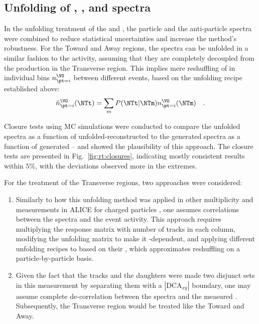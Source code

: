 \subsection{Unfolding of \KOs, \LA, and \AL \pt spectra}

In the unfolding treatment of the \LA and \AL, the particle and the anti-particle \pt spectra were combined to reduce statistical uncertainties and increase the method's robustness. For the Toward and Away regions, the spectra can be unfolded in a similar fashion to the \NT activity, assuming that they are completely decoupled from the production in the Transverse region. This implies mere reshuffling of \VOs in individual \pt bins $n^{\VO}_{\pt=i}$ between different events, based on the unfolding recipe established above:
\begin{align}
\hat{n}^{\VO}_{\pt=i}(\NTt) = \sum_m P(\NTt | \NTm) n^{\VO}_{\pt=i}(\NTm) \quad .
\end{align} 

Closure tests using MC simulations were conducted to compare the unfolded \pt spectra as a function of unfolded-reconstructed \NT to the generated \pt spectra as a function of generated \NT -- and showed the plausibility of this approach. The closure tests are presented in Fig.~\ref{fig:rt:closures}, indicating mostly consistent results within $5\%$, with the deviations observed more in the \RT extremes.

For the treatment of the Transverse regions, two approaches were considered:
\begin{enumerate}
\item Similarly to how this unfolding method was applied in other multiplicity and \NT measurements in ALICE for charged particles \cite{vazquezruedaStudyProductionPp2022}, one assumes correlations between the \pt spectra and the event activity. This approach requires multiplying the response matrix with number of tracks in each column, modifying the unfolding matrix to make it \pt-dependent, and applying different unfolding recipes to \VOs based on their \pt, which approximates reshuffling on a particle-by-particle basis.
\item Given the fact that the \NT tracks and the \VO daughters were made two disjunct sets in this measurement by separating them with a $|\mathrm{DCA}_{xy}|$ boundary, one may assume complete de-correlation between the \VO \pt spectra and the measured \NT. Subsequently, the Transverse region would be treated like the Toward and Away.
\end{enumerate}


